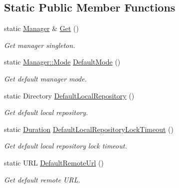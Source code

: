 \subsection*{Static Public Member Functions}
\begin{DoxyCompactItemize}
\item 
static \hyperlink{classlibrary_1_1physics_1_1coord_1_1frame_1_1provider_1_1iers_1_1_manager}{Manager} \& \hyperlink{classlibrary_1_1physics_1_1coord_1_1frame_1_1provider_1_1iers_1_1_manager_aec609996f33ad5ae72a0e3dcc3a77f78}{Get} ()
\begin{DoxyCompactList}\small\item\em Get manager singleton. \end{DoxyCompactList}\item 
static \hyperlink{classlibrary_1_1physics_1_1coord_1_1frame_1_1provider_1_1iers_1_1_manager_a84f44554ac04c5e18ed7ff448debf392}{Manager\+::\+Mode} \hyperlink{classlibrary_1_1physics_1_1coord_1_1frame_1_1provider_1_1iers_1_1_manager_a803f1c3c00bdf34a1860999613270047}{Default\+Mode} ()
\begin{DoxyCompactList}\small\item\em Get default manager mode. \end{DoxyCompactList}\item 
static Directory \hyperlink{classlibrary_1_1physics_1_1coord_1_1frame_1_1provider_1_1iers_1_1_manager_a0d62a5b30c69f723146fc366dff865dd}{Default\+Local\+Repository} ()
\begin{DoxyCompactList}\small\item\em Get default local repository. \end{DoxyCompactList}\item 
static \hyperlink{classlibrary_1_1physics_1_1time_1_1_duration}{Duration} \hyperlink{classlibrary_1_1physics_1_1coord_1_1frame_1_1provider_1_1iers_1_1_manager_a63300991a534897cc3e850e58876f62b}{Default\+Local\+Repository\+Lock\+Timeout} ()
\begin{DoxyCompactList}\small\item\em Get default local repository lock timeout. \end{DoxyCompactList}\item 
static U\+RL \hyperlink{classlibrary_1_1physics_1_1coord_1_1frame_1_1provider_1_1iers_1_1_manager_a9af03c7810e280309b30e61f051c2004}{Default\+Remote\+Url} ()
\begin{DoxyCompactList}\small\item\em Get default remote U\+RL. \end{DoxyCompactList}\end{DoxyCompactItemize}


